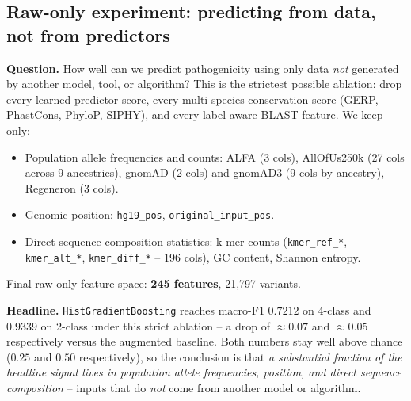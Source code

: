 \documentclass[11pt,a4paper]{article}
\begin{document}
\subsection{Raw-only experiment: predicting from data, not from predictors}
\label{sec:raw-only}

\textbf{Question.} How well can we predict pathogenicity using only data \emph{not}
generated by another model, tool, or algorithm? This is the strictest possible
ablation: drop every learned predictor score, every multi-species conservation
score (GERP, PhastCons, PhyloP, SIPHY), and every label-aware BLAST feature. We
keep only:
\begin{itemize}[leftmargin=*]
    \item Population allele frequencies and counts:
          ALFA (3 cols), AllOfUs250k (27 cols across 9 ancestries),
          gnomAD (2 cols) and gnomAD3 (9 cols by ancestry), Regeneron (3 cols).
    \item Genomic position: \texttt{hg19\_pos}, \texttt{original\_input\_pos}.
    \item Direct sequence-composition statistics: k-mer counts (\texttt{kmer\_ref\_*},
          \texttt{kmer\_alt\_*}, \texttt{kmer\_diff\_*} -- 196 cols), GC content,
          Shannon entropy.
\end{itemize}
Final raw-only feature space: \textbf{245 features}, 21{,}797 variants.

\textbf{Headline.} \texttt{HistGradientBoosting} reaches macro-F1
$\mathbf{0.7212}$ on 4-class and $\mathbf{0.9339}$ on 2-class under this
strict ablation -- a drop of $\approx 0.07$ and $\approx 0.05$ respectively
versus the augmented baseline. Both numbers stay well above chance
($0.25$ and $0.50$ respectively), so the conclusion is that
\emph{a substantial fraction of the headline signal lives in population
allele frequencies, position, and direct sequence composition} -- inputs that
do \emph{not} come from another model or algorithm.
\end{document}

